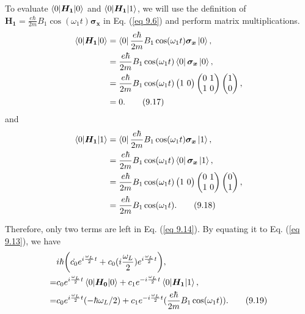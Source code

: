 \documentclass{article}
\begin{document}
To evaluate $\braket{0| \boldsymbol{H_1} |0}$ and $\braket{0| \boldsymbol{H_1} |1}$, we will use the definition
of $\boldsymbol{H_1}=\frac{e\hbar}{2m}B_1\cos(\omega_1t)\boldsymbol{\sigma_x}$ in Eq. (\ref{eq 9.6}) and perform
matrix multiplications.
\begin{align*}\label{eq 9.17}
    \braket{0|\boldsymbol{H_1}|0}&=\bra{0}\frac{e\hbar}{2m}B_1\cos(\omega_1t)\boldsymbol{\sigma_x}\ket{0},\\
    &=\frac{e\hbar}{2m}B_1\cos(\omega_1t)\bra{0}\boldsymbol{\sigma_x}\ket{0},\\
    &=\frac{e\hbar}{2m}B_1\cos(\omega_1t)\begin{pmatrix}
        1\ 0
    \end{pmatrix}
    \begin{pmatrix}
        0\ 1\\ 1\ 0
    \end{pmatrix}
    \begin{pmatrix}
        1\\0
    \end{pmatrix},\\
    &=0.\tag{9.17}
\end{align*} 
and
\begin{align*}\label{eq 9.18}
    \braket{0|\boldsymbol{H_1}|1}&=\bra{0}\frac{e\hbar}{2m}B_1\cos(\omega_1t)\boldsymbol{\sigma_x}\ket{1},\\
    &=\frac{e\hbar}{2m}B_1\cos(\omega_1t)\bra{0}\boldsymbol{\sigma_x}\ket{1},\\
    &=\frac{e\hbar}{2m}B_1\cos(\omega_1t)\begin{pmatrix}
        1\ 0
    \end{pmatrix}
    \begin{pmatrix}
        0\ 1\\ 1\ 0
    \end{pmatrix}
    \begin{pmatrix}
        0\\1
    \end{pmatrix},\\
    &=\frac{e\hbar}{2m}B_1\cos(\omega_1t).\tag{9.18}
\end{align*} 

Therefore, only two terms are left in Eq. (\ref{eq 9.14}). By equating it to
Eq. (\ref{eq 9.13}), we have
\begin{align*}\label{eq 9.19}
    &i\hbar\bigg(\dot{c_0}e^{i\frac{\omega_L}{2}t}+c_0(i\frac{\omega_L}{2})e^{i\frac{\omega_L}{2}t}\bigg),\\
    =&c_0e^{i\frac{\omega_L}{2}t}\braket{0|\boldsymbol{H_0}|0}+c_1e^{-i\frac{\omega_L}{2}t}\braket{0|\boldsymbol{H_1}|1},\\
    =&c_0e^{i\frac{\omega_L}{2}t}(-\hbar\omega_L/2)+c_1e^{-i\frac{\omega_L}{2}t}(\frac{e\hbar}{2m}B_1\cos(\omega_1t)).\tag{9.19}
\end{align*}
\end{document}
